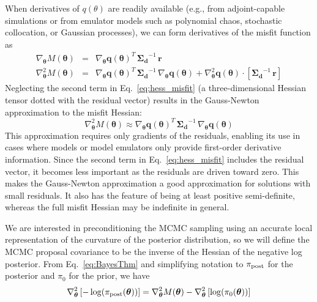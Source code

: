 When derivatives of $q(\theta)$ are readily available (e.g.,
from adjoint-capable simulations or from emulator models such as
polynomial chaos, stochastic collocation, or Gaussian processes), we
can form derivatives of the misfit function as
\begin{eqnarray}
\nabla_{\boldsymbol{\theta}} M(\boldsymbol{\theta}) &=& \nabla_{\boldsymbol{\theta}} \boldsymbol{q}(\boldsymbol{\theta})^T\,\boldsymbol{\Sigma_d}^{-1}\,\boldsymbol{r} \label{eq:grad_misfit} \\
\nabla^2_{\boldsymbol{\theta}} M(\boldsymbol{\theta}) &=& \nabla_{\boldsymbol{\theta}} \boldsymbol{q}(\boldsymbol{\theta})^T\,\boldsymbol{\Sigma_d}^{-1}\,\nabla_{\boldsymbol{\theta}} \boldsymbol{q}(\boldsymbol{\theta}) + \nabla^2_{\boldsymbol{\theta}} \boldsymbol{q}(\boldsymbol{\theta}) \cdot \left[\boldsymbol{\Sigma_d}^{-1}\,\boldsymbol{r}\right] \label{eq:hess_misfit}
\end{eqnarray}
Neglecting the second term in Eq.~\ref{eq:hess_misfit} (a
three-dimensional Hessian tensor dotted with the residual vector)
results in the Gauss-Newton approximation to the misfit Hessian:
\begin{equation}
\nabla^2_{\boldsymbol{\theta}} M(\boldsymbol{\theta}) \approx \nabla_{\boldsymbol{\theta}} \boldsymbol{q}(\boldsymbol{\theta})^T\,\boldsymbol{\Sigma_d}^{-1}\,\nabla_{\boldsymbol{\theta}} \boldsymbol{q}(\boldsymbol{\theta}) \label{eq:hess_misfit_gn}
\end{equation}
This approximation requires only gradients of the residuals, enabling
its use in cases where models or model emulators only provide
first-order derivative information.  Since the second term in
Eq.~\ref{eq:hess_misfit} includes the residual vector, it becomes less
important as the residuals are driven toward zero.  This makes the
Gauss-Newton approximation a good approximation for solutions with
small residuals.  It also has the feature of being at least positive
semi-definite, whereas the full misfit Hessian may be indefinite in general.


We are interested in preconditioning the MCMC sampling using an
accurate local representation of the curvature of the posterior
distribution, so we will define the MCMC proposal covariance to be the
inverse of the Hessian of the negative log posterior.  From
Eq.~\ref{eq:BayesThm} and simplifying notation to $\pi_{\rm post}$ for
the posterior and $\pi_0$ for the prior, we have
\begin{equation}
\nabla^2_{\boldsymbol{\theta}} 
  \left[ -\log(\pi_{\rm post}(\boldsymbol{\theta})) \right] = 
  \nabla^2_{\boldsymbol{\theta}} M(\boldsymbol{\theta}) - 
  \nabla^2_{\boldsymbol{\theta}} \left[ \log(\pi_0(\boldsymbol{\theta})) \right] 
\label{eq:hess_post}
\end{equation}

